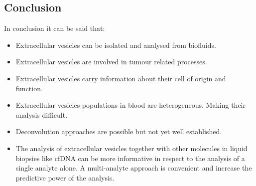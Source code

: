     \subsection{Conclusion}
    In conclusion it can be said that:

    \begin{multicols}{2}
        \begin{itemize}
            \item Extracellular vesicles can be isolated and analysed from biofluids.
            \item Extracellular vesicles are involved in tumour related processes.
            \item Extracellular vesicles carry information about their cell of origin and function.
            \item Extracellular vesicles populations in blood are heterogeneous.
                Making their analysis difficult.
            \item Deconvolution approaches are possible but not yet well established.
            \item The analysis of extracellular vesicles together with other molecules in liquid biopsies like cfDNA can be more informative in respect to the analysis of a single analyte alone.
                A multi-analyte approach is convenient and increase the predictive power of the analysis.
        \end{itemize}
    \end{multicols}
